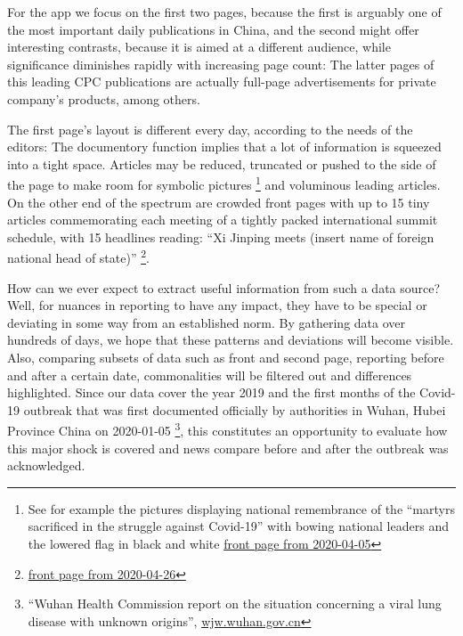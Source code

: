 \documentclass[12pt,a4paper]{article}
\let\rmarkdownfootnote\footnote%
\def\footnote{\protect\rmarkdownfootnote}
\begin{document}
For the app we focus on the first two pages, because the first is
arguably one of the most important daily publications in China, and the
second might offer interesting contrasts, because it is aimed at a
different audience, while significance diminishes rapidly with
increasing page count: The latter pages of this leading CPC publications
are actually full-page advertisements for private company's products,
among others.

The first page's layout is different every day, according to the needs
of the editors: The documentory function implies that a lot of
information is squeezed into a tight space. Articles may be reduced,
truncated or pushed to the side of the page to make room for symbolic
pictures \footnote{See for example the pictures displaying national
  remembrance of the \enquote{martyrs sacrificed in the struggle against
  Covid-19} with bowing national leaders and the lowered flag in black
  and white
  \href{http://paper.people.com.cn/rmrb/html/2020-04/05/nw.D110000renmrb_20200405_1-01.htm}{front
  page from 2020-04-05}} and voluminous leading articles. On the other
end of the spectrum are crowded front pages with up to 15 tiny articles
commemorating each meeting of a tightly packed international summit
schedule, with 15 headlines reading: \enquote{Xi Jinping meets (insert
name of foreign national head of state)} \footnote{\href{http://paper.people.com.cn/rmrb/html/2019-04/26/nbs.D110000renmrb_01.htm}{front
  page from 2020-04-26}}.

How can we ever expect to extract useful information from such a data
source? Well, for nuances in reporting to have any impact, they have to
be special or deviating in some way from an established norm. By
gathering data over hundreds of days, we hope that these patterns and
deviations will become visible. Also, comparing subsets of data such as
front and second page, reporting before and after a certain date,
commonalities will be filtered out and differences highlighted. Since
our data cover the year 2019 and the first months of the Covid-19
outbreak that was first documented officially by authorities in Wuhan,
Hubei Province China on 2020-01-05 \footnote{\enquote{Wuhan Health
  Commission report on the situation concerning a viral lung disease
  with unknown origins},
  \href{http://wjw.wuhan.gov.cn/front/web/showDetail/2020010509020}{wjw.wuhan.gov.cn}},
this constitutes an opportunity to evaluate how this major shock is
covered and news compare before and after the outbreak was acknowledged.
\end{document}
